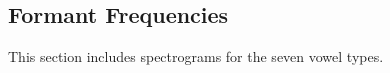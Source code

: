 \documentclass[a4paper]{article}
\begin{document}
\subsection{Formant Frequencies}
This section includes spectrograms for the seven vowel types.
\end{document}
